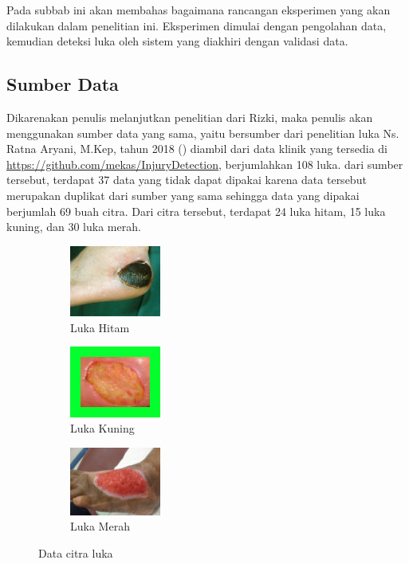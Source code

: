 Pada subbab ini akan membahas bagaimana rancangan eksperimen
yang akan dilakukan dalam penelitian ini. Eksperimen dimulai
dengan pengolahan data, kemudian deteksi luka oleh sistem
yang diakhiri dengan validasi data.

\subsection{Sumber Data}

Dikarenakan penulis melanjutkan penelitian dari Rizki, maka
penulis akan menggunakan sumber data yang sama, yaitu bersumber
dari penelitian luka Ns. Ratna Aryani, M.Kep, tahun 2018 
(\cite{Aryani:2018}) diambil dari data klinik yang tersedia di \href{https://github.com/mekas/InjuryDetection}
{https://github.com/mekas/InjuryDetection}, berjumlahkan 108 luka. dari sumber tersebut, 
terdapat 37 data yang tidak dapat dipakai karena data tersebut
merupakan duplikat dari sumber yang sama sehingga data yang
dipakai berjumlah 69 buah citra. Dari citra tersebut, terdapat
24 luka hitam, 15 luka kuning, dan 30 luka merah.
\begin{figure}[H]
	\centering
	\begin{subfigure}{.3\textwidth}
		\centering
		\includegraphics[keepaspectratio, width=3cm]{gambar/Bab3Extra/LukaHitam.jpg}
		\caption{Luka Hitam}
	\end{subfigure}
	\begin{subfigure}{.3\textwidth}
		\centering
		\includegraphics[keepaspectratio, width=3cm]{gambar/Bab3Extra/LukaKuning.jpg}
		\caption{Luka Kuning}
	\end{subfigure} 
	\begin{subfigure}{.3\textwidth}
		\centering
		\includegraphics[keepaspectratio, width=3cm]{gambar/Bab3Extra/LukaMerah.jpg}
		\caption{Luka Merah}
	\end{subfigure}
	\caption{Data citra luka}
\end{figure}

